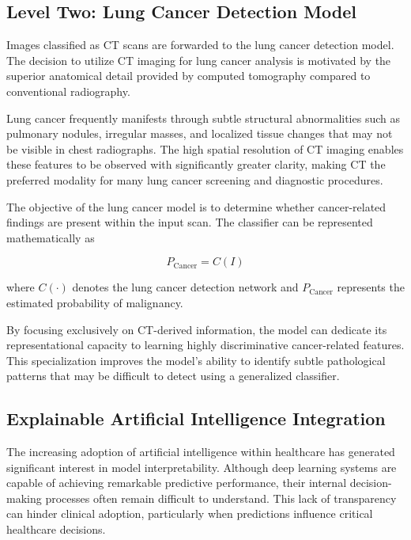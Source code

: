 \subsection{Level Two: Lung Cancer Detection Model}

Images classified as CT scans are forwarded to the lung cancer detection model. The decision to utilize CT imaging for lung cancer analysis is motivated by the superior anatomical detail provided by computed tomography compared to conventional radiography.

Lung cancer frequently manifests through subtle structural abnormalities such as pulmonary nodules, irregular masses, and localized tissue changes that may not be visible in chest radiographs. The high spatial resolution of CT imaging enables these features to be observed with significantly greater clarity, making CT the preferred modality for many lung cancer screening and diagnostic procedures.

The objective of the lung cancer model is to determine whether cancer-related findings are present within the input scan. The classifier can be represented mathematically as

\begin{equation}
	P_{\text{Cancer}} = C(I)
\end{equation}

where $C(\cdot)$ denotes the lung cancer detection network and $P_{\text{Cancer}}$ represents the estimated probability of malignancy.

By focusing exclusively on CT-derived information, the model can dedicate its representational capacity to learning highly discriminative cancer-related features. This specialization improves the model's ability to identify subtle pathological patterns that may be difficult to detect using a generalized classifier.

\subsection{Explainable Artificial Intelligence Integration}

The increasing adoption of artificial intelligence within healthcare has generated significant interest in model interpretability. Although deep learning systems are capable of achieving remarkable predictive performance, their internal decision-making processes often remain difficult to understand. This lack of transparency can hinder clinical adoption, particularly when predictions influence critical healthcare decisions.

